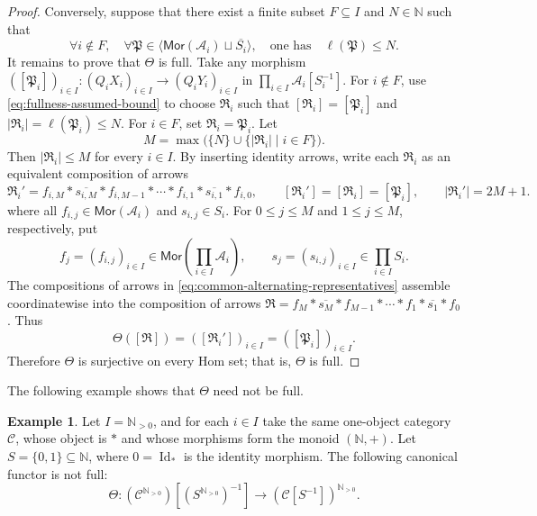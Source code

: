 \documentclass[10pt,a4paper]{amsart}
\theoremstyle{plain}
\theoremstyle{definition}
\newtheorem{example}[theorem]{Example}
\theoremstyle{remark}
\begin{document}
\begin{proof}
  Conversely, suppose that there exist a finite subset $F\subseteq I$ and $N\in\mathbb N$ such that
  \begin{equation}\label{eq:fullness-assumed-bound}
    \forall i\notin F,\quad
    \forall \mathfrak P\in
    \langle\mathsf{Mor}(\mathcal A_i)\sqcup\overline{S_i}\rangle, \quad \text{one has}
    \quad
    \ell(\mathfrak P)\leq N.
  \end{equation}
  It remains to prove that $\Theta$ is full.
  Take any morphism $([\mathfrak P_i])_{i\in I}:(Q_iX_i)_{i\in I}\longrightarrow(Q_iY_i)_{i\in I}$ in $\prod_{i \in I}\mathcal{A}_i[S_i^{-1}]$.
  For $i\notin F$, use \eqref{eq:fullness-assumed-bound} to choose $\mathfrak R_i$ such that $[\mathfrak R_i]=[\mathfrak P_i]$ and $|\mathfrak R_i|=\ell(\mathfrak P_i)\leq N$.
  For $i\in F$, set $\mathfrak R_i=\mathfrak P_i$.
  Let
  \begin{equation}\label{eq:fullness-global-composition-bound}
    M=\max\bigl(\{N\}\cup
    \{|\mathfrak R_i|\mid i\in F\}\bigr).
  \end{equation}
  Then $|\mathfrak R_i|\leq M$ for every $i\in I$.
  By inserting identity arrows, write each $\mathfrak R_i$ as an equivalent composition of arrows
  \begin{equation}\label{eq:common-alternating-representatives}
    \mathfrak R_i'
    =f_{i,M}\ast\overline{s_{i,M}}\ast f_{i,M-1}\ast
    \cdots\ast f_{i,1}\ast\overline{s_{i,1}}\ast f_{i,0},\qquad
    [\mathfrak R_i']=[\mathfrak R_i]=[\mathfrak P_i],\qquad
    |\mathfrak R_i'| = 2M+1.
  \end{equation}
  where all $f_{i,j}\in\mathsf{Mor}(\mathcal A_i)$ and $s_{i,j}\in S_i$.
  For $0\leq j\leq M$ and $1\leq j\leq M$, respectively, put
  \[
    f_j=(f_{i,j})_{i\in I}\in
    \mathsf{Mor}\left(\prod_{i\in I}\mathcal A_i\right),
    \qquad
    s_j=(s_{i,j})_{i\in I}\in\prod_{i\in I}S_i.
  \]
  The compositions of arrows in \eqref{eq:common-alternating-representatives} assemble coordinatewise into the composition of arrows $\mathfrak R=f_M\ast\overline{s_M}\ast f_{M-1}\ast\cdots\ast f_1\ast\overline{s_1}\ast f_0$.
  Thus
  \[
    \Theta ([\mathfrak R]) = ([\mathfrak R_i'])_{i\in I} =([\mathfrak P_i])_{i\in I}.
  \]
  Therefore $\Theta$ is surjective on every Hom set; that is, $\Theta$ is full.
\end{proof}

The following example shows that $\Theta$ need not be full.

\begin{example}\label{ex:product-localization-not-full}
  Let $I=\mathbb N_{>0}$, and for each $i\in I$ take the same one-object category $\mathcal C$, whose object is $\ast$ and whose morphisms form the monoid $(\mathbb N,+)$.
  Let $S=\{0,1\}\subseteq\mathbb N$, where $0 = \operatorname{Id}_\ast$ is the identity morphism.
  The following canonical functor is not full:
  \[
    \Theta:(\mathcal C^{\mathbb N_{>0}})[(S^{\mathbb N_{>0}})^{-1}]
    \longrightarrow(\mathcal C[S^{-1}])^{\mathbb N_{>0}}.
  \]
\end{example}
\end{document}
